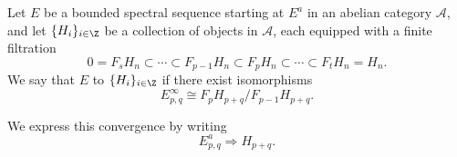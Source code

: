 \documentclass[main.tex]{subfiles}
\begin{document}
\begin{definition}
  \label{def:bounded_convergence}
  Let $E$ be a bounded spectral sequence starting at $E^{a}$ in an abelian category $\mathcal{A}$, and let $\{H_{i}\}_{i \in \Z}$ be a collection of objects in $\mathcal{A}$, each equipped with a finite filtration
  \begin{equation*}
    0 = F_{s}H_{n} \subset \cdots \subset F_{p-1}H_{n} \subset F_{p}H_{n} \subset \cdots \subset F_{t}H_{n} = H_{n}.
  \end{equation*}
  We say that $E$  to $\{H_{i}\}_{i \in \Z}$ if there exist isomorphisms
  \begin{equation*}
    E^{\infty}_{p,q} \cong F_{p}H_{p+q}/F_{p-1}H_{p+q}.
  \end{equation*}

  We express this convergence by writing
  \begin{equation*}
    E^{a}_{p,q} \Rightarrow H_{p+q}.
  \end{equation*}
\end{definition}
\end{document}
